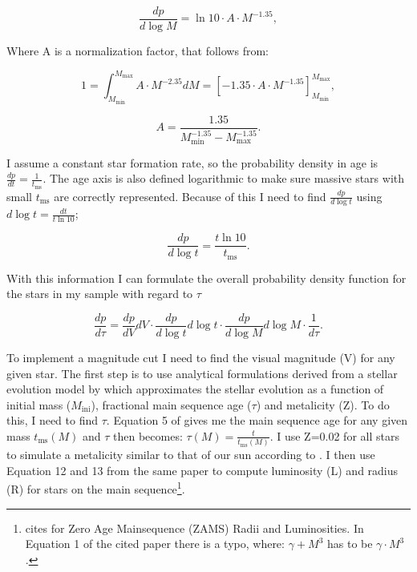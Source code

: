 \documentclass[a4paper,10pt]{article}
\begin{document}
 \begin{equation}
  \frac{dp}{d\log M}=\ln 10 \cdot A\cdot M^{-1.35},
 \end{equation}
 
 Where A is a normalization factor, that follows from: 
 
 \begin{equation}
  1=\int_{M_{\mathrm{min}}}^{M_{\mathrm{max}}}A\cdot M^{-2.35} dM =\left[ -1.35\cdot A\cdot M^{-1.35}\right]_{M_{\mathrm{min}}}^{M_{\mathrm{max}}},
 \end{equation}
 
 \begin{equation}
  A= \frac{1.35}{M_{\mathrm{min}}^{-1.35}-M_{\mathrm{max}}^{-1.35}}.
 \end{equation}
 
 I assume a constant star formation rate, so the probability density in age is $\frac{dp}{dt}=\frac{1}{t_{\mathrm{ms}}}$. 
 The age axis is also defined logarithmic to make sure massive stars with small $t_{\mathrm{ms}}$ are correctly represented.
 Because of this I need to find $\frac{dp}{d\log t}$ using $d\log t=\frac{dt}{t \ln 10}$; 

 \begin{equation}
  \frac{dp}{d\log t}=\frac{t\ln 10}{t_{\mathrm{ms}}}.
 \end{equation}

 With this information I can formulate the overall probability density function for the stars in my sample with regard to $\tau$
 
 \begin{equation}
  \frac{dp}{d\tau}=\frac{dp}{dV}dV \cdot \frac{dp}{d\log t}d\log t \cdot \frac{dp}{d\log M}d\log M\cdot \frac{1}{d\tau}.
 \end{equation}
  
 
 To implement a magnitude cut I need to find the visual magnitude (V) for any given star. 
 The first step is to use analytical formulations derived from a stellar evolution model by \citet{2000MNRAS.315..543H} which approximates the
 stellar evolution as a function of initial mass ($M_{\mathrm{ini}}$), fractional main sequence age ($\tau$) and metalicity (Z).
 To do this, I need to find $\tau$. Equation 5 of \citep{2000MNRAS.315..543H} gives me the main sequence age for any given mass
 $t_{\mathrm{ms}}(M)$ and $\tau$ then becomes: $\tau(M)=\frac{t}{t_{\mathrm{ms}}(M)}$. I use Z=0.02 for all stars to simulate a metalicity
 similar to that of our sun according to \citet*{1998SSRv...85..161G}.
 I then use Equation 12 and 13 from the same paper to compute luminosity (L) and radius (R) for stars on the main sequence\footnote{
 \citet{2000MNRAS.315..543H} cites \citet*{1996MNRAS.281..257T} for Zero Age Mainsequence (ZAMS) Radii and Luminosities. 
 In Equation 1 of the cited paper there is a typo, where: $\gamma + M^3$ has to be $\gamma \cdot M^3$.}. \\
 
\end{document}
